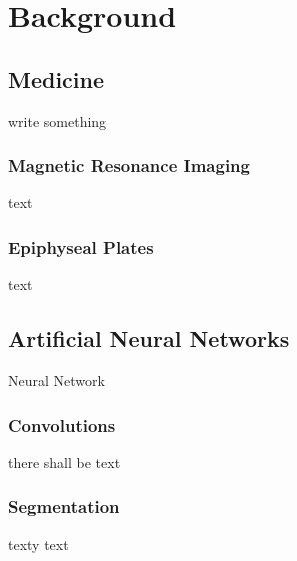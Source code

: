 \section{Background}

\subsection{Medicine}

write something

\subsubsection{Magnetic Resonance Imaging}

text

\subsubsection{Epiphyseal Plates}

text

\subsection{Artificial Neural Networks}

Neural Network

\subsubsection{Convolutions}

there shall be text

\subsubsection{Segmentation}

texty text

\newpage
